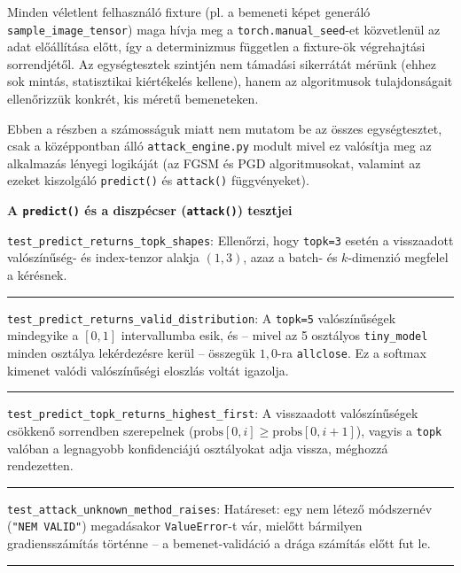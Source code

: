 Minden véletlent felhasználó fixture (pl. a bemeneti képet generáló \texttt{sample\_image\_tensor}) maga hívja meg a 
\texttt{torch.manual\_seed}-et közvetlenül az adat előállítása előtt, így a determinizmus független a fixture-ök végrehajtási 
sorrendjétől. 
Az egységtesztek szintjén nem támadási sikerrátát mérünk (ehhez sok mintás, statisztikai kiértékelés kellene), hanem az 
algoritmusok tulajdonságait ellenőrizzük konkrét, kis méretű bemeneteken. 

Ebben a részben a számosságuk miatt nem mutatom be az összes egységtesztet, csak a középpontban álló \texttt{attack\_engine.py} 
modult mivel ez valósítja meg az alkalmazás lényegi logikáját (az FGSM és PGD algoritmusokat, valamint az ezeket kiszolgáló 
\texttt{predict()} és \texttt{attack()} függvényeket). 

\bigskip
\noindent\textbf{A \texttt{predict()} és a diszpécser (\texttt{attack()}) tesztjei}

\medskip
\noindent\texttt{test\_predict\_returns\_topk\_shapes}: Ellenőrzi, hogy \texttt{topk=3} esetén a visszaadott valószínűség- és 
index-tenzor alakja $(1, 3)$, azaz a batch- és $k$-dimenzió megfelel a kérésnek. 

\medskip
\noindent\rule{\linewidth}{0.3pt}

\medskip
\noindent\texttt{test\_predict\_returns\_valid\_distribution}: A \texttt{topk=5} valószínűségek mindegyike a $[0, 1]$ 
intervallumba esik, és -- mivel az 5 osztályos \texttt{tiny\_model} minden osztálya lekérdezésre kerül -- összegük $1{,}0$-ra 
\texttt{allclose}. 
Ez a softmax kimenet valódi valószínűségi eloszlás voltát igazolja. 

\medskip
\noindent\rule{\linewidth}{0.3pt}

\medskip
\noindent\texttt{test\_predict\_topk\_returns\_highest\_first}: A visszaadott valószínűségek csökkenő sorrendben szerepelnek 
($\mathrm{probs}[0, i] \geq \mathrm{probs}[0, i+1]$), vagyis a \texttt{topk} valóban a legnagyobb konfidenciájú osztályokat adja 
vissza, méghozzá rendezetten. 

\medskip
\noindent\rule{\linewidth}{0.3pt}

\medskip
\noindent\texttt{test\_attack\_unknown\_method\_raises}: Határeset: egy nem létező módszernév (\texttt{"NEM VALID"})
megadásakor \texttt{ValueError}-t vár, mielőtt bármilyen gradiensszámítás történne -- a bemenet-validáció a drága számítás előtt 
fut le. 

\medskip
\noindent\rule{\linewidth}{0.3pt}

